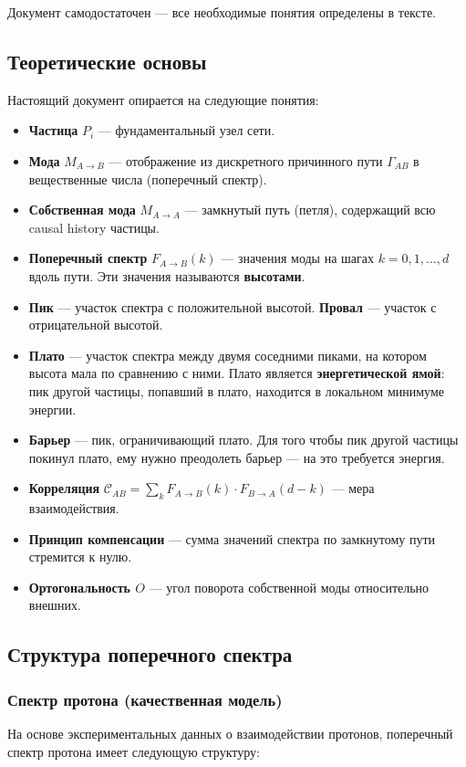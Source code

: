 \documentclass[12pt,a4paper]{article}
\begin{document}
Документ самодостаточен --- все необходимые понятия определены в тексте.

\subsection{Теоретические основы}
Настоящий документ опирается на следующие понятия:

\begin{itemize}
    \item \textbf{Частица} $P_i$ --- фундаментальный узел сети.
    \item \textbf{Мода} $M_{A \to B}$ --- отображение из дискретного причинного пути $\Gamma_{AB}$ в вещественные числа (поперечный спектр).
    \item \textbf{Собственная мода} $M_{A \to A}$ --- замкнутый путь (петля), содержащий всю causal history частицы.
    \item \textbf{Поперечный спектр} $F_{A \to B}(k)$ --- значения моды на шагах $k = 0, 1, \dots, d$ вдоль пути. Эти значения называются \textbf{высотами}.
    \item \textbf{Пик} --- участок спектра с положительной высотой. \textbf{Провал} --- участок с отрицательной высотой.
    \item \textbf{Плато} --- участок спектра между двумя соседними пиками, на котором высота мала по сравнению с ними. Плато является \textbf{энергетической ямой}: пик другой частицы, попавший в плато, находится в локальном минимуме энергии.
    \item \textbf{Барьер} --- пик, ограничивающий плато. Для того чтобы пик другой частицы покинул плато, ему нужно преодолеть барьер --- на это требуется энергия.
    \item \textbf{Корреляция} $\mathcal{C}_{AB} = \sum_k F_{A \to B}(k) \cdot F_{B \to A}(d-k)$ --- мера взаимодействия.
    \item \textbf{Принцип компенсации} --- сумма значений спектра по замкнутому пути стремится к нулю.
    \item \textbf{Ортогональность $O$} --- угол поворота собственной моды относительно внешних.
\end{itemize}

\subsection{Структура поперечного спектра}

\subsubsection{Спектр протона (качественная модель)}
На основе экспериментальных данных о взаимодействии протонов, поперечный спектр протона имеет следующую структуру:
\end{document}
